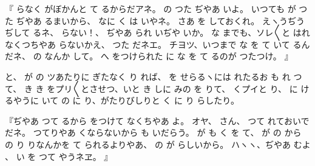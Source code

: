 『
らなく
がぼかんと
て
るからだアネ。
の
つた
ぢやあ
いよ。
いつても
が
つた
ぢやあ
るまいから、
なに
く
は
いやネ。
さあ
を
しておくれ。
えヽうぢうぢして
るネ、
らない！、
ぢやあ
られ
いぢや
いか。
な
までも、ソレ〳〵と
はれなくつちやあ
らないかえ、
つた
だネエ。
チヨツ、いつまで
な
を
て
いて
るんだネ、
の
なんか
して。
へ
をつけられた
に
な
を
て
るのが
つたつけ。
』

と、
が
の
ツあたりに
ぎたなく
り
れば、
を
せらるヽには
れたるお
も
れ
つて、
き
き
をプリ〳〵とさせつ、いと
き
しに
みの
を
りて、
くプイと
り、
に
けるやうに
いて
の
に
り、がたりびしりと
く
に
り
らしたり。

『ぢやあ
つて
るから
をつけて
なくちやあ
よ。
オヤ、
さん、
つて
れておいでだネ。
つてりやあ
くならないから
も
いだらう。
が
も
く
を
て、
が
の
から
の
り
りなんかを
て
られるよりやあ、
の
が
らしいから。
ハヽヽ、ぢやあ
むよ
、
い
を
つて
やうネヱ。
』

